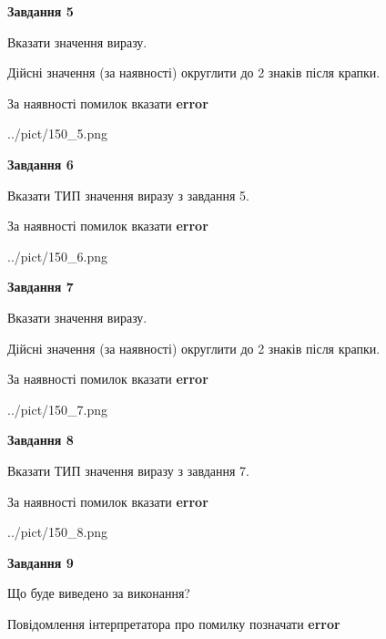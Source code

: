 \documentclass[11pt, ukrainian]{article}
\begin{document}
{\begin {large}
{\begin {center}\textbf{Завдання 5}\end {center}}\par
Вказати значення виразу. \par
Дійсні значення (за наявності) округлити до 2 знаків після крапки. \par
За наявності помилок вказати \textbf{error}

\begin{center}
	{../pict/150_5.png}
\end{center}
\newpage

{\begin {center}\textbf{Завдання 6}\end {center}}\par
Вказати ТИП значення виразу з завдання 5. \par
За наявності помилок вказати \textbf{error}

\begin{center}
	{../pict/150_6.png}
\end{center}
\newpage

{\begin {center}\textbf{Завдання 7}\end {center}}\par
Вказати значення виразу. \par
Дійсні значення (за наявності) округлити до 2 знаків після крапки. \par
За наявності помилок вказати \textbf{error}

\begin{center}
	{../pict/150_7.png}
\end{center}
\newpage

{\begin {center}\textbf{Завдання 8}\end {center}}\par
Вказати ТИП значення виразу з завдання 7. \par
За наявності помилок вказати \textbf{error}

\begin{center}
	{../pict/150_8.png}
\end{center}
\newpage

{\begin {center}\textbf{Завдання 9}\end {center}}\par
Що буде виведено за виконання? \par
Повідомлення інтерпретатора про помилку позначати \textbf{error}


\end{large}}
\end{document}
